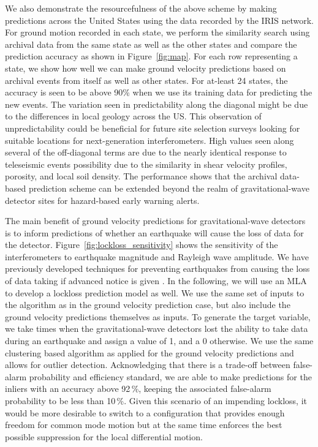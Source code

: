 \documentclass[twocolumn, aps, superscriptaddress]{revtex4}
\begin{document}
We also demonstrate the resourcefulness  of the above scheme by making predictions across the United States using the data recorded by the IRIS network. For ground motion recorded in each state, we perform the similarity search using archival data from the same state as well as the other states and compare the prediction accuracy as shown in Figure~\ref{fig:map}. For each row representing a state, we show how well we can make ground velocity predictions based on archival events from itself as well as other states. For at-least 24 states, the accuracy is seen to be above 90\% when we use its training data for predicting the new events. The variation seen in predictability along the diagonal might be due to the differences in local geology across the US. This observation of unpredictability could be beneficial for future site selection surveys looking for suitable locations for next-generation interferometers. High values seen along several of the off-diagonal terms are due to the nearly identical response to teleseismic events possibility due to the similarity in shear velocity profiles, porosity, and local soil density. The performance shows that the archival data-based prediction scheme can be extended beyond the realm of gravitational-wave detector sites for hazard-based early warning alerts.

The main benefit of ground velocity predictions for gravitational-wave detectors is to inform predictions of whether an earthquake will cause the loss of data for the detector. Figure~\ref{fig:lockloss_sensitivity} shows the sensitivity of the interferometers to earthquake magnitude and Rayleigh wave amplitude.
We have previously developed techniques for preventing earthquakes from causing the loss of data taking if advanced notice is given \cite{BiWa2018}.
In the following, we will use an MLA to develop a lockloss prediction model as well. 
We use the same set of inputs to the algorithm as in the ground velocity prediction case, but also include the ground velocity predictions themselves as inputs.
To generate the target variable, we take times when the gravitational-wave detectors lost the ability to take data during an earthquake and assign a value of 1, and a 0 otherwise. We use the same clustering based algorithm as applied for the ground velocity predictions and allows for outlier detection.
Acknowledging that there is a trade-off between false-alarm probability and efficiency standard, 
we are able to make predictions for the inliers with an accuracy above 92\,\%, keeping the associated false-alarm probability to be less than 10\,\%. Given this scenario of an impending lockloss, it would be more desirable to switch to a configuration that provides enough freedom for common mode motion but at the same time enforces the best possible suppression for the local differential motion.
\end{document}
